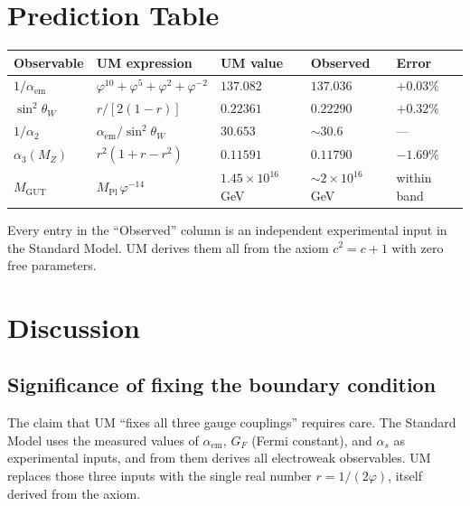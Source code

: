 \documentclass[12pt]{article}
\begin{document}
\section{Prediction Table}

\begin{center}
{\color{gold}
\begin{tabular}{lllll}
\toprule
Observable & UM expression & UM value & Observed & Error \\
\midrule
$1/\alpha_{\text{em}}$
  & $\varphi^{10}+\varphi^5+\varphi^2+\varphi^{-2}$
  & $137.082$ & $137.036$ & $+0.03\%$ \\
$\sin^2\!\theta_W$
  & $r/[2(1-r)]$
  & $0.22361$ & $0.22290$ & $+0.32\%$ \\
$1/\alpha_2$
  & $\alpha_{\text{em}}/\sin^2\!\theta_W$
  & $30.653$  & ${\sim}30.6$ & --- \\
$\alpha_3(M_Z)$
  & $r^2(1+r-r^2)$
  & $0.11591$ & $0.11790$ & $-1.69\%$ \\
$M_{\text{GUT}}$
  & $M_{\text{Pl}}\,\varphi^{-14}$
  & $1.45\times10^{16}$\,GeV & ${\sim}2\times10^{16}$\,GeV & within band \\
\bottomrule
\end{tabular}
}
\end{center}

Every entry in the ``Observed'' column is an independent experimental
input in the Standard Model. UM derives them all from the axiom $c^2 = c+1$
with zero free parameters.

\section{Discussion}

\subsection{Significance of fixing the boundary condition}

The claim that UM ``fixes all three gauge couplings'' requires care. The
Standard Model uses the measured values of $\alpha_{\text{em}}$, $G_F$
(Fermi constant), and $\alpha_s$ as experimental inputs, and from them
derives all electroweak observables. UM replaces those three inputs with the
single real number $r = 1/(2\varphi)$, itself derived from the axiom.
\end{document}
